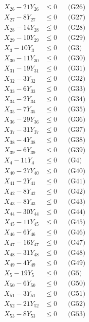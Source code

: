 \documentclass[a4paper,10pt]{article}
\begin{document}
{\begin{align}
X_{26} - 21Y_{26} &\leq 0 && \text{(G26)} \\
\allowbreak
X_{27} - 8Y_{27} &\leq 0 && \text{(G27)} \\
X_{28} - 14Y_{28} &\leq 0 && \text{(G28)} \\
X_{29} - 10Y_{29} &\leq 0 && \text{(G29)} \\
X_{3} - 10Y_{3} &\leq 0 && \text{(G3)} \\
X_{30} - 11Y_{30} &\leq 0 && \text{(G30)} \\
X_{31} - 19Y_{31} &\leq 0 && \text{(G31)} \\
X_{32} - 3Y_{32} &\leq 0 && \text{(G32)} \\
X_{33} - 6Y_{33} &\leq 0 && \text{(G33)} \\
X_{34} - 2Y_{34} &\leq 0 && \text{(G34)} \\
X_{35} - 7Y_{35} &\leq 0 && \text{(G35)} \\
X_{36} - 29Y_{36} &\leq 0 && \text{(G36)} \\
X_{37} - 31Y_{37} &\leq 0 && \text{(G37)} \\
X_{38} - 4Y_{38} &\leq 0 && \text{(G38)} \\
X_{39} - 6Y_{39} &\leq 0 && \text{(G39)} \\
X_{4} - 11Y_{4} &\leq 0 && \text{(G4)} \\
X_{40} - 27Y_{40} &\leq 0 && \text{(G40)} \\
X_{41} - 2Y_{41} &\leq 0 && \text{(G41)} \\
X_{42} - 8Y_{42} &\leq 0 && \text{(G42)} \\
X_{43} - 8Y_{43} &\leq 0 && \text{(G43)} \\
X_{44} - 30Y_{44} &\leq 0 && \text{(G44)} \\
\allowbreak
X_{45} - 11Y_{45} &\leq 0 && \text{(G45)} \\
X_{46} - 6Y_{46} &\leq 0 && \text{(G46)} \\
X_{47} - 16Y_{47} &\leq 0 && \text{(G47)} \\
X_{48} - 31Y_{48} &\leq 0 && \text{(G48)} \\
X_{49} - 4Y_{49} &\leq 0 && \text{(G49)} \\
X_{5} - 19Y_{5} &\leq 0 && \text{(G5)} \\
X_{50} - 6Y_{50} &\leq 0 && \text{(G50)} \\
X_{51} - 3Y_{51} &\leq 0 && \text{(G51)} \\
X_{52} - 21Y_{52} &\leq 0 && \text{(G52)} \\
X_{53} - 8Y_{53} &\leq 0 && \text{(G53)} \\

\end{align}}
\end{document}
